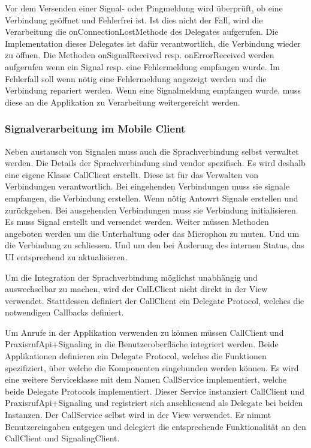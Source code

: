 Vor dem Versenden einer Signal- oder Pingmeldung wird überprüft, ob eine Verbindung geöffnet und Fehlerfrei ist.
Ist dies nicht der Fall, wird die Verarbeitung die onConnectionLostMethode des Delegates aufgerufen.
Die Implementation dieses Delegates ist dafür verantwortlich, die Verbindung wieder zu öffnen.
Die Methoden onSignalReceived resp. onErrorReceived werden aufgerufen wenn ein Signal resp. eine Fehlermeldung empfangen wurde.
Im Fehlerfall soll wenn nötig eine Fehlermeldung angezeigt werden und die Verbindung repariert werden.
Wenn eine Signalmeldung empfangen wurde, muss diese an die Applikation zu Verarbeitung weitergereicht werden.

\clearpage

\subsubsection{Signalverarbeitung im Mobile Client}

Neben austausch von Signalen muss auch die Sprachverbindung selbst verwaltet werden.
Die Details der Sprachverbindung sind vendor spezifisch.
Es wird deshalb eine eigene Klasse CallClient erstellt.
Diese ist für das Verwalten von Verbindungen verantwortlich.
Bei eingehenden Verbindungen muss sie signale empfangen, die Verbindung erstellen.
Wenn nötig Antowrt Signale erstellen und zurückgeben.
Bei ausgehenden Verbindungen muss sie Verbindung initialisieren.
Es muss Signal erstellt und versendet werden.
Weiter müssen Methoden angeboten werden um die Unterhaltung oder das Microphon zu muten.
Und um die Verbindung zu schliessen.
Und um den bei Änderung des internen Status, das UI entsprechend zu aktualisieren.

Um die Integration der Sprachverbindung möglichst unabhängig und auswechselbar zu machen, wird der CalLClient nicht direkt in der View verwendet.
Stattdessen definiert der CallClient ein Delegate Protocol, welches die notwendigen Callbacks definiert.



Um Anrufe in der Applikation verwenden zu können müssen CallClient und PraxisrufApi+Signaling in die Benutzeroberfläche integriert werden.
Beide Applikationen definieren ein Delegate Protocol, welches die Funktionen spezifiziert, über welche die Komponenten eingebunden werden können.
Es wird eine weitere Serviceklasse mit dem Namen CallService implementiert, welche beide Delegate Protocols implementiert.
Dieser Service instanziert CallClient und PraxisrufApi+Signaling und registriert sich anschliessend als Delegate bei beiden Instanzen.
Der CallService selbst wird in der View verwendet.
Er nimmt Benutzereingaben entgegen und delegiert die entsprechende Funktionalität an den CallClient und SignalingClient.

